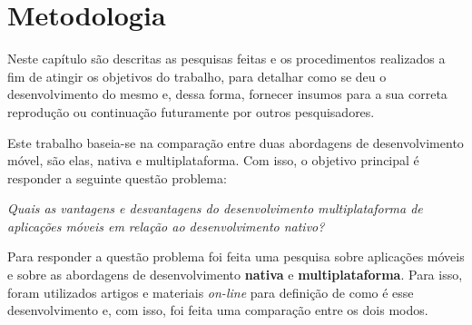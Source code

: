 \chapter{Metodologia} \label{cap:metodologia}
Neste capítulo são descritas as pesquisas feitas e os procedimentos realizados a 
fim de atingir os objetivos do trabalho, para detalhar como se deu o desenvolvimento do mesmo e, 
dessa forma, fornecer insumos para a sua correta reprodução ou continuação futuramente por outros pesquisadores.

Este trabalho baseia-se na comparação entre duas abordagens de desenvolvimento móvel, são elas, nativa e multiplataforma. 
Com isso, o objetivo principal é responder a seguinte questão problema:
\begin{center}
    \textit{Quais as vantagens e desvantagens do desenvolvimento multiplataforma de aplicações móveis em relação ao desenvolvimento nativo?}
\end{center}



Para responder a questão problema foi feita uma pesquisa sobre aplicações móveis e sobre as abordagens de desenvolvimento \textbf{nativa} e \textbf{multiplataforma}.
Para isso, foram utilizados artigos e materiais \textit{on-line} para definição de como é esse desenvolvimento e, com isso, foi feita uma comparação entre os dois modos. 

